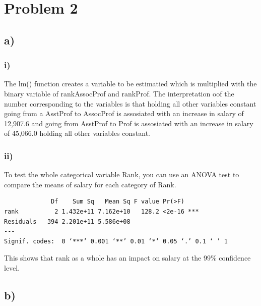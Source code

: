 \documentclass[
]{article}
\begin{document}
\hypertarget{problem-2}{%
\section{Problem 2}\label{problem-2}}

\hypertarget{a-1}{%
\subsection{a)}\label{a-1}}

\hypertarget{i}{%
\subsubsection{i)}\label{i}}

The lm() function creates a variable to be estimatied which is
multiplied with the binary variable of rankAssocProf and rankProf. The
interpretation oof the number corresponding to the variables is that
holding all other variables constant going from a AsstProf to AssocProf
is assosiated with an increase in salary of 12,907.6 and going from
AsstProf to Prof is assosiated with an increase in salary of 45,066.0
holding all other variables constant.

\hypertarget{ii}{%
\subsubsection{ii)}\label{ii}}

To test the whole categorical variable Rank, you can use an ANOVA test
to compare the means of salary for each category of Rank.

\begin{verbatim}
             Df    Sum Sq   Mean Sq F value Pr(>F)    
rank          2 1.432e+11 7.162e+10   128.2 <2e-16 ***
Residuals   394 2.201e+11 5.586e+08                   
---
Signif. codes:  0 ‘***’ 0.001 ‘**’ 0.01 ‘*’ 0.05 ‘.’ 0.1 ‘ ’ 1
\end{verbatim}

This shows that rank as a whole has an impact on salary at the 99\%
confidence level.

\hypertarget{b-1}{%
\subsection{b)}\label{b-1}}
\end{document}
